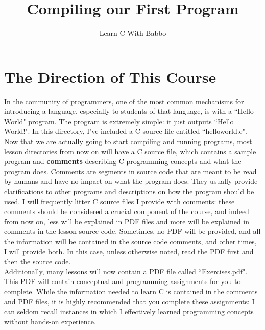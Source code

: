 \documentclass{article}
\begin{document}
\title{Compiling our First Program}
\author{Learn C With Babbo}
\date{}
\maketitle
\section*{The Direction of This Course}
In the community of programmers, one of the most common mechanisms for introducing a language, especially to students
of that language, is with a ``Hello World" program. The program is extremely simple: it just outputs ``Hello World!".
In this directory, I've included a C source file entitled ``helloworld.c". Now that we are actually going to start
compiling and running programs, most lesson directories from now on will have a C source file, which contains a sample
program and \textbf{comments} describing C programming concepts and what the program does. Comments are segments in 
source code that are meant to be read by humans and have no impact on what the program does. They usually provide
clarifications to other programs and descriptions on how the program should be used. I will frequently litter C source
files I provide with comments: these comments should be considered a crucial component of the course, and indeed
from now on, less will be explained in PDF files and more will be explained in comments in the lesson source code.
Sometimes, no PDF will be provided, and all the information will be contained in the source code comments, and other
times, I will provide both. In this case, unless otherwise noted, read the PDF first and then the source code. \\

Additionally, many lessons will now contain a PDF file called ``Exercises.pdf". This PDF will contain conceptual and 
programming assignments for you to complete. While the information needed to learn C is contained in the comments and 
PDF files, it is highly recommended that you complete these assignments: I can seldom recall instances in which I 
effectively learned programming concepts without hands-on experience. \\ \\
\end{document}
